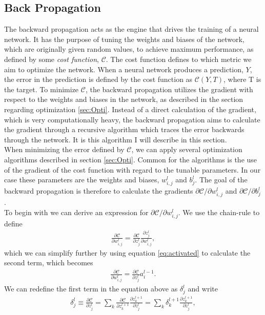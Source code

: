 \subsection{Back Propagation}\label{subsec:BP}
The backward propagation acts as the engine that drives the training of a neural network. It has the purpose
of tuning the weights and biases of the network, which are originally given random values, to achieve maximum performance,
as defined by some \emph{cost function}, $\mathcal{C}$. The cost function defines to which metric we aim to optimize the network. 
When a neural network produces a prediction, $Y$, the error in the prediction
is defined by the cost function as $\mathcal{C}\left(Y, T\right)$, where T is the target. To minimize $\mathcal{C}$, the 
backward propagation utilizes the gradient with respect to the weights and biases in the network, as described in the section 
regarding optimization \ref{sec:Opti}. Instead of a direct calculation of the gradient, which is very computationally heavy, 
the backward propagation aims to calculate the gradient through a recursive algorithm which traces the error backwards through 
the network. It is this algorithm I will describe in this section.
\\
When minimizing the error defined by $\mathcal{C}$, we can apply several optimization algorithms described in 
section \ref{sec:Opti}. Common for the algorithms is the use of the gradient of the cost function with regard to 
the tunable parameters. In our case these parameters are the weights and biases, $w_{i,j}^l$ and $b^l_j$. The goal of 
the backward propagation is therefore to calculate the gradients $\partial \mathcal{C}/\partial w_{i,j}^l$ and
$\partial \mathcal{C}/\partial b^l_j$. 
\\
To begin with we can derive an expression for $\partial \mathcal{C}/\partial w_{i,j}^l$. We use the chain-rule to define 
\begin{align*}
    \frac{\partial \mathcal{C}}{\partial w_{i,j}^l} = \frac{\partial \mathcal{C}}{\partial z^l_j} \frac{\partial z^l_j}{\partial w_{i,j}^l},
\end{align*}
which we can simplify further by using equation \ref{eq:activated} to calculate the second term, which becomes
\begin{align*}
    \frac{\partial \mathcal{C}}{\partial w_{i,j}^l} = \frac{\partial \mathcal{C}}{\partial z^l_j} a^{l-1}_i.
\end{align*}
We can redefine the first term in the equation above as $\delta_j^l$ and write
\begin{align*}
    \delta_j^l \equiv \frac{\partial \mathcal{C}}{\partial z^l_j}
               = \sum_k \frac{\partial \mathcal{C}}{\partial z^{l+1}_k}\frac{\partial z_k^{l+1}}{\partial z^l_j}  
               = \sum_k \delta_k^{l+1}\frac{\partial z_k^{l+1}}{\partial z^l_j},
\end{align*}
